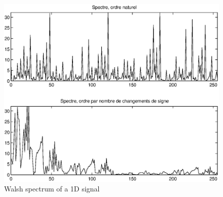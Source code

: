 \begin{exo}
\begin{enumerate}
\begin{figure}[ht]
    \begin{center}
    \includegraphics[scale = 0.5]{images/spectre-walsh-1d.eps}
    \end{center}
    \caption{Walsh spectrum of a 1D signal}
              \label{fig-spectrum-walsh-1d}
\end{figure}
 

\end{enumerate}
\end{exo}

